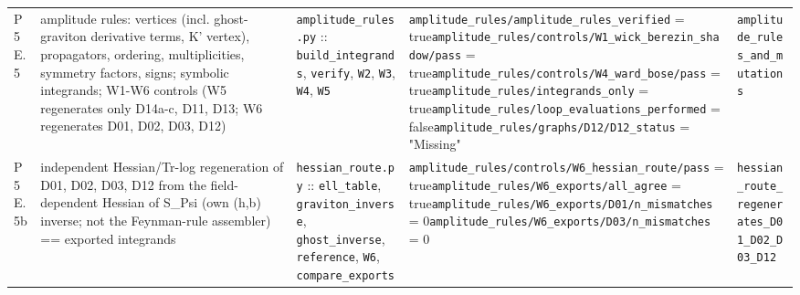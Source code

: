 {\begin{longtable}{@{}p{0.9cm}p{4.1cm}p{3.5cm}p{5.0cm}p{3.0cm}@{}}
P5E.5 & amplitude rules: vertices (incl. ghost-graviton derivative terms, K' vertex), propagators, ordering, multiplicities, symmetry factors, signs; symbolic integrands; W1-W6 controls (W5 regenerates only D14a-c, D11, D13; W6 regenerates D01, D02, D03, D12) & \texttt{amplitude\_\allowbreak{}rules.\allowbreak{}py} :: \texttt{build\_\allowbreak{}integrands}, \texttt{verify}, \texttt{W2}, \texttt{W3}, \texttt{W4}, \texttt{W5} & \texttt{\allowbreak{}amplitude\_\allowbreak{}rules/\allowbreak{}amplitude\_\allowbreak{}rules\_\allowbreak{}verified} = true\newline \texttt{\allowbreak{}amplitude\_\allowbreak{}rules/\allowbreak{}controls/\allowbreak{}W1\_\allowbreak{}wick\_\allowbreak{}berezin\_\allowbreak{}shadow/\allowbreak{}pass} = true\newline \texttt{\allowbreak{}amplitude\_\allowbreak{}rules/\allowbreak{}controls/\allowbreak{}W4\_\allowbreak{}ward\_\allowbreak{}bose/\allowbreak{}pass} = true\newline \texttt{\allowbreak{}amplitude\_\allowbreak{}rules/\allowbreak{}integrands\_\allowbreak{}only} = true\newline \texttt{\allowbreak{}amplitude\_\allowbreak{}rules/\allowbreak{}loop\_\allowbreak{}evaluations\_\allowbreak{}performed} = false\newline \texttt{\allowbreak{}amplitude\_\allowbreak{}rules/\allowbreak{}graphs/\allowbreak{}D12/\allowbreak{}D12\_\allowbreak{}status} = "Missing" & \texttt{amplitude\_\allowbreak{}rules\_\allowbreak{}and\_\allowbreak{}mutations} \\
P5E.5b & independent Hessian/Tr-log regeneration of D01, D02, D03, D12 from the field-dependent Hessian of S\_Psi (own (h,b) inverse; not the Feynman-rule assembler) == exported integrands & \texttt{hessian\_\allowbreak{}route.\allowbreak{}py} :: \texttt{ell\_\allowbreak{}table}, \texttt{graviton\_\allowbreak{}inverse}, \texttt{ghost\_\allowbreak{}inverse}, \texttt{reference}, \texttt{W6}, \texttt{compare\_\allowbreak{}exports} & \texttt{\allowbreak{}amplitude\_\allowbreak{}rules/\allowbreak{}controls/\allowbreak{}W6\_\allowbreak{}hessian\_\allowbreak{}route/\allowbreak{}pass} = true\newline \texttt{\allowbreak{}amplitude\_\allowbreak{}rules/\allowbreak{}W6\_\allowbreak{}exports/\allowbreak{}all\_\allowbreak{}agree} = true\newline \texttt{\allowbreak{}amplitude\_\allowbreak{}rules/\allowbreak{}W6\_\allowbreak{}exports/\allowbreak{}D01/\allowbreak{}n\_\allowbreak{}mismatches} = 0\newline \texttt{\allowbreak{}amplitude\_\allowbreak{}rules/\allowbreak{}W6\_\allowbreak{}exports/\allowbreak{}D03/\allowbreak{}n\_\allowbreak{}mismatches} = 0 & \texttt{hessian\_\allowbreak{}route\_\allowbreak{}regenerates\_\allowbreak{}D01\_\allowbreak{}D02\_\allowbreak{}D03\_\allowbreak{}D12} \\

\end{longtable}}
